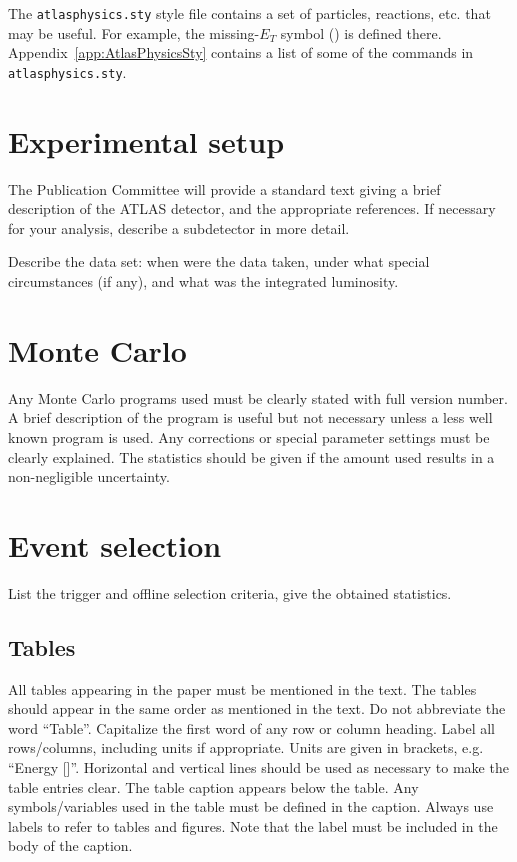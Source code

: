 \documentclass[11pt,a4paper]{../atlasnote}
\begin{document}
The {\tt atlasphysics.sty} style file contains a set of particles,
reactions, etc. that may be useful. For example, the missing-$E_T$
symbol (\met{}) is defined there. Appendix~\ref{app:AtlasPhysicsSty}
contains a list of some of the commands in {\tt atlasphysics.sty}.

\section{Experimental setup}

The Publication Committee will provide a standard text giving a brief
description of the ATLAS detector, and the appropriate references.  If
necessary for your analysis, describe a subdetector in more detail.

Describe the data set: when were the data taken, under what special
circumstances (if any), and what was the integrated luminosity.

\section{Monte Carlo}

Any Monte Carlo programs used must be clearly stated with full version
number. A brief description of the program is useful but not necessary
unless a less well known program is used.  Any corrections or special
parameter settings must be clearly explained.  The statistics should
be given if the amount used results in a non-negligible uncertainty.

\section{Event selection}

List the trigger and offline selection criteria, give the obtained
statistics.

\subsection{Tables}

All tables appearing in the paper must be mentioned in the text. The
tables should appear in the same order as mentioned in the text. Do
not abbreviate the word ``Table''. Capitalize the first word of any
row or column heading. Label all rows/columns, including units if
appropriate. Units are given in brackets, e.g. ``Energy [\gev]''.
Horizontal and vertical lines should be used as necessary to make the
table entries clear. 
The table caption appears below the table.  
Any symbols/variables used in the table must be defined in the
caption.  Always use labels to refer to tables and figures. Note that
the label must be included in the body of the caption.
\end{document}
